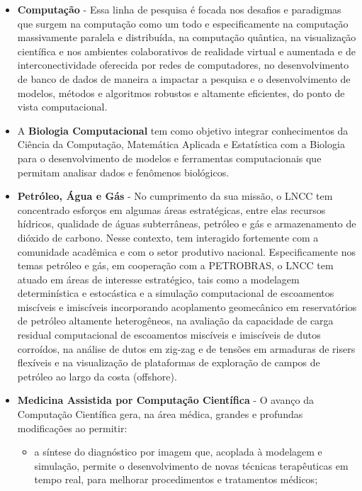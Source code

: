 \begin{itemize}
	\item \textbf{Computação} - Essa linha de pesquisa é focada nos
		desafios e paradigmas que surgem na computação como um
		todo e especificamente na computação massivamente
		paralela e distribuída, na computação quântica, na
		visualização científica e nos ambientes colaborativos de
		realidade virtual e aumentada e de interconectividade
		oferecida por redes de computadores, no desenvolvimento
		de banco de dados de maneira a impactar a pesquisa e o
		desenvolvimento de modelos, métodos e algoritmos
		robustos e altamente eficientes, do ponto de vista
		computacional.

	\item A \textbf{Biologia Computacional} tem como objetivo
		integrar conhecimentos da Ciência da Computação,
		Matemática Aplicada e Estatística com a Biologia para o
		desenvolvimento de modelos e ferramentas computacionais
		que permitam analisar dados e fenômenos biológicos. 

	\item \textbf{Petróleo, Água e Gás} - No cumprimento da sua
		missão, o LNCC tem concentrado esforços em algumas áreas
		estratégicas, entre elas recursos hídricos, qualidade de
		águas subterrâneas, petróleo e gás e armazenamento de
		dióxido de carbono. Nesse contexto, tem interagido
		fortemente com a comunidade acadêmica e com o setor
		produtivo nacional.  Especificamente nos temas petróleo
		e gás, em cooperação com a PETROBRAS, o LNCC tem atuado
		em áreas de interesse estratégico, tais como a modelagem
		determinística e estocástica e a simulação computacional
		de escoamentos miscíveis e imiscíveis incorporando
		acoplamento geomecânico em reservatórios de petróleo
		altamente heterogêneos, na avaliação da capacidade de
		carga residual computacional de escoamentos miscíveis e
		imiscíveis de dutos corroídos, na análise de dutos em
		zig-zag e de tensões em armaduras de risers flexíveis e
		na visualização de plataformas de exploração de campos
		de petróleo ao largo da costa (offshore).

	\item \textbf{Medicina Assistida por Computação Científica} - O
		avanço da Computação Científica gera, na área médica,
		grandes e profundas modificações ao permitir:
		\begin{itemize}

			\item a síntese do diagnóstico por imagem que,
				acoplada à modelagem e simulação,
				permite o desenvolvimento de novas
				técnicas terapêuticas em tempo real,
				para melhorar procedimentos e
				tratamentos médicos;


\end{itemize}
\end{itemize}
